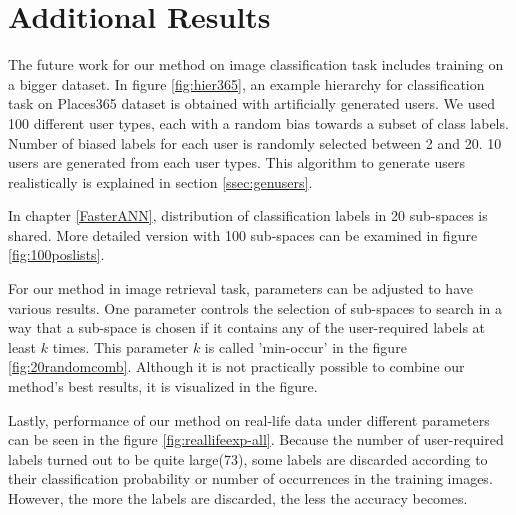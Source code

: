 
\lhead[\chaptername~\thechapter]{\rightmark}

\rhead[\leftmark]{}

\lfoot[\thepage]{}

\cfoot{}

\rfoot[]{\thepage}

\chapter{Additional Results\label{Appen}}

The future work for our method on image classification task includes training on a bigger dataset. 
In figure \ref{fig:hier365}, an example hierarchy for classification task on Places365 dataset is obtained with artificially generated users.
We used 100 different user types, each with a random bias towards a subset of class labels. Number of biased labels for each user is randomly selected between 2 and 20. 
10 users are generated from each user types. This algorithm to generate users realistically is explained in section \ref{ssec:genusers}.

In chapter \ref{FasterANN}, distribution of classification labels in 20 sub-spaces is shared. More detailed version with 100 sub-spaces can be examined in figure \ref{fig:100poslists}.

For our method in image retrieval task, parameters can be adjusted to have various results. 
One parameter controls the selection of sub-spaces to search in a way that a sub-space is chosen if it contains any of the user-required labels at least $k$ times. 
This parameter $k$ is called 'min-occur' in the figure \ref{fig:20randomcomb}. 
Although it is not practically possible to combine our method's best results, it is visualized in the figure.

Lastly, performance of our method on real-life data under different parameters can be seen in the figure \ref{fig:reallifeexp-all}. 
Because the number of user-required labels turned out to be quite large(73), some labels are discarded according to their classification probability or number of occurrences in the training images. 
However, the more the labels are discarded, the less the accuracy becomes.


